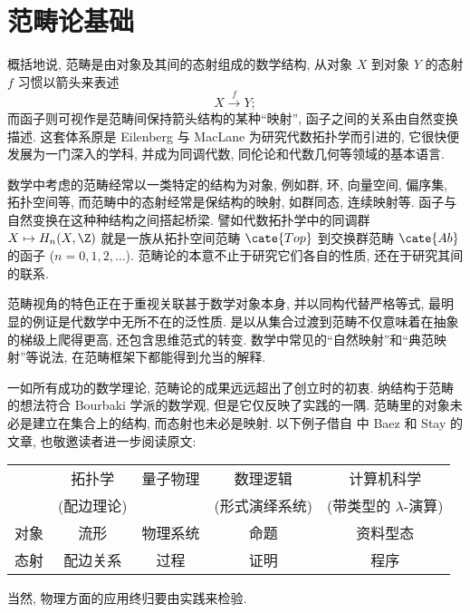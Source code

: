 
\chapter{范畴论基础}\label{sec:category}
概括地说, 范畴是由对象及其间的态射组成的数学结构, 从对象 $X$ 到对象 $Y$ 的态射 $f$ 习惯以箭头来表述
\[ X \xrightarrow{f} Y; \]
而函子则可视作是范畴间保持箭头结构的某种``映射'', 函子之间的关系由自然变换描述. 这套体系原是 Eilenberg 与 MacLane \cite{EM45} 为研究代数拓扑学而引进的, 它很快便发展为一门深入的学科, 并成为同调代数, 同伦论和代数几何等领域的基本语言.

数学中考虑的范畴经常以一类特定的结构为对象, 例如群, 环, 向量空间, 偏序集, 拓扑空间等, 而范畴中的态射经常是保结构的映射, 如群同态, 连续映射等. 函子与自然变换在这种种结构之间搭起桥梁. 譬如代数拓扑学中的同调群 $X \mapsto H_n(X, \Z)$ 就是一族从拓扑空间范畴 $\cate{Top}$ 到交换群范畴 $\cate{Ab}$ 的函子 ($n=0,1,2,\ldots$). 范畴论的本意不止于研究它们各自的性质, 还在于研究其间的联系.

范畴视角的特色正在于重视关联甚于数学对象本身, 并以同构代替严格等式, 最明显的例证是代数学中无所不在的泛性质. 是以从集合过渡到范畴不仅意味着在抽象的梯级上爬得更高, 还包含思维范式的转变. 数学中常见的``自然映射''和``典范映射''等说法, 在范畴框架下都能得到允当的解释.

一如所有成功的数学理论, 范畴论的成果远远超出了创立时的初衷. 纳结构于范畴的想法符合 Bourbaki 学派的数学观, 但是它仅反映了实践的一隅. 范畴里的对象未必是建立在集合上的结构, 而态射也未必是映射. 以下例子借自 \cite{Co11} 中 Baez 和 Stay 的文章, 也敬邀读者进一步阅读原文:
\begin{center}
\begin{tabular}{|c|c|c|c|c|} \hline
	& 拓扑学 & 量子物理 & 数理逻辑 & 计算机科学 \\
	& (配边理论) & & (形式演绎系统) & (带类型的 $\lambda$-演算) \\ \hline
	对象 &  流形 &  物理系统 &  命题 & 资料型态 \\ \hline
	态射 &  配边关系 &  过程 & 证明 & 程序 \\ \hline
\end{tabular}
\end{center}
当然, 物理方面的应用终归要由实践来检验.


